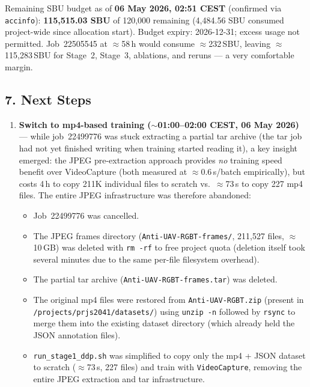 \noindent Remaining SBU budget as of \textbf{06 May 2026, 02:51 CEST}
(confirmed via \texttt{accinfo}):
\textbf{115,515.03 SBU} of 120,000 remaining
(4,484.56 SBU consumed project-wide since allocation start).
Budget expiry: 2026-12-31; excess usage not permitted.
Job~22505545 at $\approx$58\,h would consume $\approx$232\,SBU,
leaving $\approx$115,283\,SBU for Stage~2, Stage~3, ablations,
and reruns — a very comfortable margin.

\subsection*{7. Next Steps}

\begin{enumerate}
    \item \textbf{Switch to mp4-based training
          ($\sim$01:00--02:00 CEST, 06 May 2026)} —
          while job~22499776 was stuck extracting a partial tar archive
          (the tar job had not yet finished writing when training
          started reading it), a key insight emerged: the JPEG
          pre-extraction approach provides \emph{no} training speed
          benefit over VideoCapture (both measured at
          $\approx$0.6\,s/batch empirically), but costs 4\,h to copy
          211K individual files to scratch vs.\ $\approx$73\,s to copy
          227 mp4 files. The entire JPEG infrastructure was therefore
          abandoned:
          \begin{itemize}
              \item Job~22499776 was cancelled.
              \item The JPEG frames directory
                    (\texttt{Anti-UAV-RGBT-frames/}, 211,527 files,
                    $\approx$10\,GB) was deleted with \texttt{rm -rf}
                    to free project quota (deletion itself took several
                    minutes due to the same per-file filesystem overhead).
              \item The partial tar archive
                    (\texttt{Anti-UAV-RGBT-frames.tar}) was deleted.
              \item The original mp4 files were restored from
                    \texttt{Anti-UAV-RGBT.zip} (present in
                    \texttt{/projects/prjs2041/datasets/}) using
                    \texttt{unzip -n} followed by \texttt{rsync} to
                    merge them into the existing dataset directory
                    (which already held the JSON annotation files).
              \item \texttt{run\_stage1\_ddp.sh} was simplified to
                    copy only the mp4 + JSON dataset to scratch
                    ($\approx$73\,s, 227 files) and train with
                    \texttt{VideoCapture}, removing the entire JPEG
                    extraction and tar infrastructure.
          \end{itemize}


\end{enumerate}

